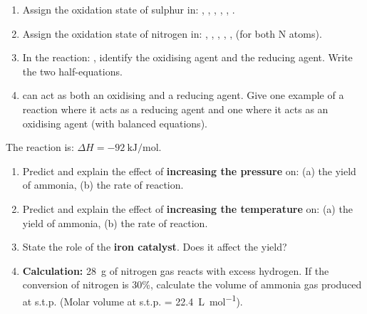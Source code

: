 \documentclass[11pt]{article}
\begin{document}
\begin{exercice}
\begin{enumerate}
\item Assign the oxidation state of sulphur in: , , , , , .
\item Assign the oxidation state of nitrogen in: , , , , ,  (for both N atoms).
\item In the reaction: , identify the oxidising agent and the reducing agent. Write the two half-equations.
\item {} can act as both an oxidising and a reducing agent. Give one example of a reaction where it acts as a reducing agent and one where it acts as an oxidising agent (with balanced equations).
\end{enumerate}
\end{exercice}

\begin{exercice}
The reaction is:  \quad $\Delta H = -\SI{92}{\kilo\joule\per\mole}$.
\begin{enumerate}
\item Predict and explain the effect of \textbf{increasing the pressure} on: (a) the yield of ammonia, (b) the rate of reaction.
\item Predict and explain the effect of \textbf{increasing the temperature} on: (a) the yield of ammonia, (b) the rate of reaction.
\item State the role of the \textbf{iron catalyst}. Does it affect the yield?
\item \textbf{Calculation:} \SI{28}{\gram} of nitrogen gas reacts with excess hydrogen. If the conversion of nitrogen is 30\%, calculate the volume of ammonia gas produced at s.t.p. (Molar volume at s.t.p. = \SI{22.4}{\liter\per\mole}).
\end{enumerate}
\end{exercice}
\end{document}
